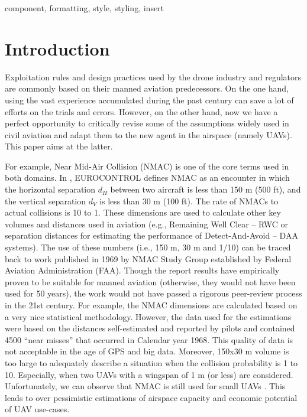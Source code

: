 \documentclass[conference]{IEEEtran}
\begin{document}
\begin{IEEEkeywords}
component, formatting, style, styling, insert
\end{IEEEkeywords}

\section{Introduction}
Exploitation rules and design practices used by the drone industry and regulators are commonly based on their manned aviation predecessors. 
On the one hand, using the vast experience accumulated during the past century can save a lot of efforts on the trials and errors. 
However, on the other hand, now we have a perfect opportunity to critically revise some of the assumptions widely used in civil aviation and adapt them to the new agent in the airspace (namely UAVs). 
This paper aims at the latter.


For example, Near Mid-Air Collision (NMAC) is one of the core terms used in both domains. 
In \cite{eurocontrol}, EUROCONTROL defines NMAC as an encounter in which the horizontal separation $d_H$ between two aircraft is less than 150 m (500 ft), and the vertical separation $d_V$  is less than 30 m (100 ft). 
The rate of NMACs to actual collisions is 10 to 1. 
These dimensions are used to calculate other key volumes and distances used in aviation (e.g., Remaining Well Clear – RWC or separation distances for estimating the performance of Detect-And-Avoid – DAA systems). 
The use of these numbers (i.e., 150 m, 30 m and 1/10) can be traced back to work \cite{NMAC_sg} published in 1969 by NMAC Study Group established by Federal Aviation Administration (FAA). 
Though the report results have empirically proven to be suitable for manned aviation (otherwise, they would not have been used for 50 years), the work would not have passed a rigorous peer-review process in the 21st century. 
For example, the NMAC dimensions are calculated based on a very nice statistical methodology. 
However, the data used for the estimations were based on the distances self-estimated and reported by pilots and contained 4500 “near misses” that occurred in Calendar year 1968. 
This quality of data is not acceptable in the age of GPS and big data. 
Moreover, 150x30 m volume is too large to adequately describe a situation when the collision probability is 1 to 10.
Especially, when two UAVs with a wingspan of 1 m (or less) are considered. Unfortunately, we can observe that NMAC is still used for small UAVs \cite{Assure,Weinert16,Cook15,Weinert18}. 
This leads to over pessimistic estimations of airspace capacity and economic potential of UAV use-cases.
\end{document}
